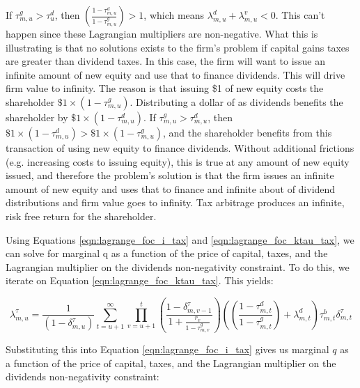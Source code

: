 \documentclass[letterpaper,12pt]{article}
\theoremstyle{definition}
\begin{document}
\begin{spacing}{1.5}
If $\tau^{g}_{m,u}> \tau^{d}_{u}$, then $ \left(\frac{1-\tau^{d}_{m,u}}{1-\tau^{g}_{m,u}}\right)>1$, which means  $ \lambda^{d}_{m,u} + \lambda^{v}_{m,u} <0$.  This can't happen since these Lagrangian multipliers are non-negative.  What this is illustrating is that no solutions exists to the firm's problem if capital gains taxes are greater than dividend taxes.  In this case, the firm will want to issue an infinite amount of new equity and use that to finance dividends.  This will drive firm value to infinity.  The reason is that issuing \$1 of new equity costs the shareholder $\$1\times(1-\tau^{g}_{m,u})$.  Distributing a dollar of as dividends benefits the shareholder by $\$1\times (1-\tau^{d}_{m,u})$.  If $\tau^{g}_{m,u}> \tau^{d}_{m,u}$, then $\$1\times (1-\tau^{d}_{m,u}) > \$1\times(1-\tau^{g}_{m,u})$, and the shareholder benefits from this transaction of using new equity to finance dividends.  Without additional frictions (e.g. increasing costs to issuing equity), this is true at any amount of new equity issued, and therefore the problem's solution is that the firm issues an infinite amount of new equity and uses that to finance and infinite about of dividend distributions and firm value goes to infinity.  Tax arbitrage produces an infinite, risk free return for the shareholder.

Using Equations \ref{eqn:lagrange_foc_i_tax} and \ref{eqn:lagrange_foc_ktau_tax}, we can solve for marginal q as a function of the price of capital, taxes, and the Lagrangian multiplier on the dividends non-negativity constraint.  To do this, we iterate on Equation \ref{eqn:lagrange_foc_ktau_tax}.  This yields:

\begin{equation}
\lambda^{\tau}_{m,u} = \frac{1}{(1-\delta^{\tau}_{m,u})} \sum_{t=u+1}^{\infty} \prod_{v=u+1}^{t} \left(\frac{1-\delta^{\tau}_{m,v-1}}{1+\frac{r_{v}}{1-\tau^{g}_{m,v}}} \right)\left(\left(\frac{1-\tau^{d}_{m,t}}{1-\tau^{g}_{m,t}}\right)+\lambda^{d}_{m,t}\right)\tau^{b}_{m,t}\delta^{\tau}_{m,t}
\end{equation}

Substituting this into Equation \ref{eqn:lagrange_foc_i_tax} gives us marginal $q$ as a function of the price of capital, taxes, and the Lagrangian multiplier on the dividends non-negativity constraint: 


\end{spacing}
\end{document}
